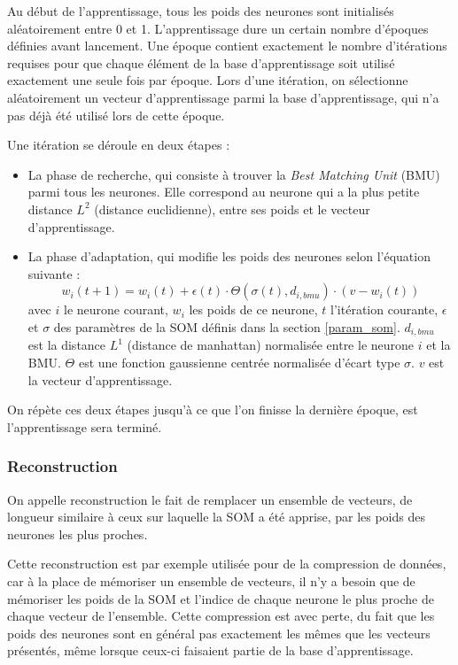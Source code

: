 	Au début de l'apprentissage, tous les poids des neurones sont initialisés aléatoirement entre 0 et 1. L'apprentissage dure un certain nombre d'époques définies avant lancement. Une époque contient exactement le nombre d'itérations requises pour que chaque élément de la base d'apprentissage soit utilisé exactement une seule fois par époque. Lors d'une itération, on sélectionne aléatoirement un vecteur d'apprentissage parmi la base d'apprentissage, qui n'a pas déjà été utilisé lors de cette époque. 

	Une itération se déroule en deux étapes : 
	\begin{itemize}
		\item La phase de recherche, qui consiste à trouver la \textit{Best Matching Unit} (BMU) parmi tous les neurones. Elle correspond au neurone qui a la plus petite distance $L^2$ (distance euclidienne), entre ses poids et le vecteur d'apprentissage.
		\item La phase d'adaptation, qui modifie les poids des neurones selon l'équation suivante :
		\begin{equation}\label{eq:SOM}
			w_i(t+1) = w_i(t)+\epsilon(t)\cdot\Theta(\sigma(t),d_{i,bmu})\cdot(v-w_i(t))
		\end{equation} avec $i$ le neurone courant, $w_i$ les poids de ce neurone, $t$ l'itération courante, $\epsilon$ et $\sigma$ des paramètres de la SOM définis dans la section \ref{param_som}. $d_{i, bmu}$ est la distance $L^1$ (distance de manhattan) normalisée entre le neurone $i$ et la BMU. $\Theta$ est une fonction gaussienne centrée normalisée d'écart type $\sigma$. $v$ est la vecteur d'apprentissage.
	\end{itemize}

	On répète ces deux étapes jusqu'à ce que l'on finisse la dernière époque, est l'apprentissage sera terminé.

\subsubsection{Reconstruction}
	
	On appelle reconstruction le fait de remplacer un ensemble de vecteurs, de longueur similaire à ceux sur laquelle la SOM a été apprise, par les poids des neurones les plus proches.

	Cette reconstruction est par exemple utilisée pour de la compression de données, car à la place de mémoriser un ensemble de vecteurs, il n'y a besoin que de mémoriser les poids de la SOM et l'indice de chaque neurone le plus proche de chaque vecteur de l'ensemble. Cette compression est avec perte, du fait que les poids des neurones sont en général pas exactement les mêmes que les vecteurs présentés, même lorsque ceux-ci faisaient partie de la base d'apprentissage.

